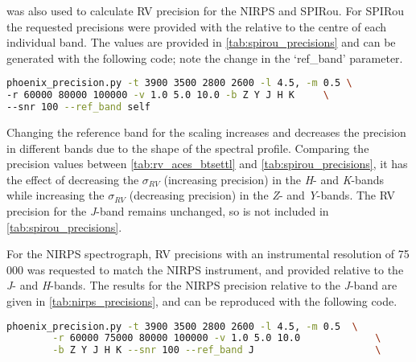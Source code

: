 \Eniric{} was also used to calculate {RV} precision for the {NIRPS} and {SPIRou}.
For {SPIRou} the requested precisions were provided with the \snr{} relative to the centre of each individual band.
The values are provided in \cref{tab:spirou_precisions} and can be generated with the following code; note the change in the `ref\_band' parameter.

\begin{lstlisting}[language={bash},caption={Shell incantation for the {SPIRou} {ETC} {RV} precisions.},label={lst:spirou_incantation}]
phoenix_precision.py -t 3900 3500 2800 2600 -l 4.5, -m 0.5 \
-r 60000 80000 100000 -v 1.0 5.0 10.0 -b Z Y J H K     \
--snr 100 --ref_band self
\end{lstlisting}

Changing the reference band for the \snr{} scaling increases and decreases the precision in different bands due to the shape of the spectral profile.
Comparing the precision values between \cref{tab:rv_aces_btsettl} and \cref{tab:spirou_precisions}, it has the effect of decreasing the $\sigma_{RV}$ (increasing precision) in the \emph{H}- and \emph{K}-bands while increasing the $\sigma_{RV}$ (decreasing precision) in the \emph{Z}- and \emph{Y}-bands.
The {RV} precision for the \emph{J}-band remains unchanged, so is not included in \cref{tab:spirou_precisions}.


For the {NIRPS} spectrograph, {RV} precisions with an instrumental resolution of 75\,000 was requested to match the {NIRPS} instrument, and provided relative to the \emph{J}- and \emph{H}-bands.
The results for the {NIRPS} precision relative to the \emph{J}-band are given in \cref{tab:nirps_precisions}, and can be reproduced with the following code.

\begin{lstlisting}[language={bash},caption={Shell incantation for the {NIRPS} {ETC} {RV} precisions.},label={lst:nirps_incantation}]
    phoenix_precision.py -t 3900 3500 2800 2600 -l 4.5, -m 0.5  \
        -r 60000 75000 80000 100000 -v 1.0 5.0 10.0             \
        -b Z Y J H K --snr 100 --ref_band J                     \
\end{lstlisting}







